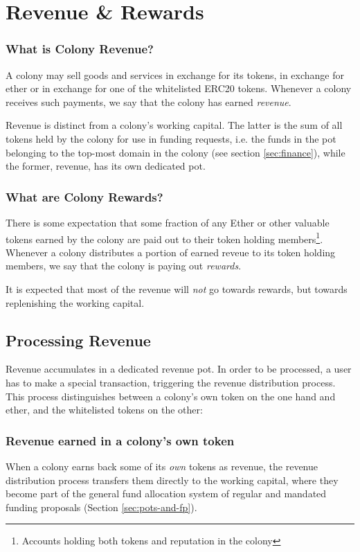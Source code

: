 \section{Revenue \& Rewards}\label{sec:revenue}

\subsubsection*{What is Colony Revenue?}
A colony may sell goods and services in exchange for its tokens, in exchange for ether or in exchange for one of the whitelisted ERC20 tokens. Whenever a colony receives such payments, we say that the colony has earned \emph{revenue}.

Revenue is distinct from a colony's working capital. The latter is the sum of all tokens held by the colony for use in funding requests, i.e. the funds in the pot belonging to the top-most domain in the colony (see section \ref{sec:finance}), while the former, revenue, has its own dedicated pot.

\subsubsection*{What are Colony Rewards?}
There is some expectation that some fraction of any Ether or other valuable tokens earned by the colony are paid out to their token holding members\footnote{Accounts holding both tokens and reputation in the colony}. Whenever a colony distributes a portion of earned reveue to its token holding members, we say that the colony is paying out \emph{rewards}.

It is expected that most of the revenue will \emph{not} go towards rewards, but towards replenishing the working capital.

\subsection{Processing Revenue}
Revenue accumulates in a dedicated revenue pot. In order to be processed, a user has to make a special transaction, triggering the revenue distribution process. This process distinguishes between a colony's own token on the one hand and ether, \rct and the whitelisted tokens on the other:

\subsubsection*{Revenue earned in a colony's own token}
When a colony earns back some of its \emph{own} tokens as revenue, the revenue distribution process transfers them directly to the working capital, where they become part of the general fund allocation system of regular and mandated funding proposals (Section \ref{sec:pots-and-fp}).

